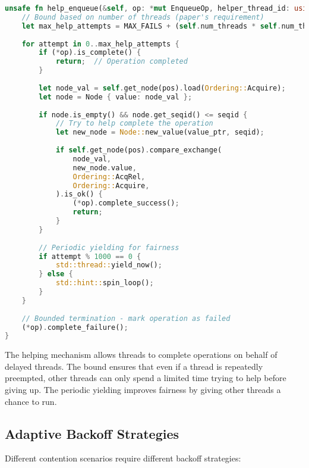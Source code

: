 \begin{lstlisting}[language=Rust, style=boxed, caption={Bounded helping mechanism for wait-freedom}, label={lst:bounded-helping}]
unsafe fn help_enqueue(&self, op: *mut EnqueueOp, helper_thread_id: usize) {
    // Bound based on number of threads (paper's requirement)
    let max_help_attempts = MAX_FAILS + (self.num_threads * self.num_threads);
    
    for attempt in 0..max_help_attempts {
        if (*op).is_complete() {
            return;  // Operation completed
        }
        
        let node_val = self.get_node(pos).load(Ordering::Acquire);
        let node = Node { value: node_val };
        
        if node.is_empty() && node.get_seqid() <= seqid {
            // Try to help complete the operation
            let new_node = Node::new_value(value_ptr, seqid);
            
            if self.get_node(pos).compare_exchange(
                node_val,
                new_node.value,
                Ordering::AcqRel,
                Ordering::Acquire,
            ).is_ok() {
                (*op).complete_success();
                return;
            }
        }
        
        // Periodic yielding for fairness
        if attempt % 1000 == 0 {
            std::thread::yield_now();
        } else {
            std::hint::spin_loop();
        }
    }
    
    // Bounded termination - mark operation as failed
    (*op).complete_failure();
}
\end{lstlisting}

The helping mechanism allows threads to complete operations on behalf of delayed threads. The bound ensures that even if a thread is repeatedly preempted, other threads can only spend a limited time trying to help before giving up. The periodic yielding improves fairness by giving other threads a chance to run.

\subsection{Adaptive Backoff Strategies}

Different contention scenarios require different backoff strategies:


